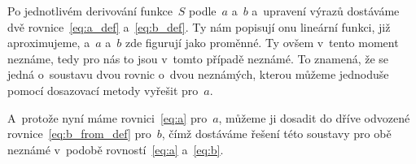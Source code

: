 Po jednotlivém derivování funkce~$S$ podle~$a$ a~$b$ a~upravení výrazů
dostáváme dvě rovnice~\eqref{eq:a_def} a~\eqref{eq:b_def}. Ty nám popisují onu
lineární funkci, již aproximujeme, a~$a$ a~$b$ zde figurují jako proměnné. Ty
ovšem v~tento moment neznáme, tedy pro nás to jsou v~tomto případě neznámé.
To znamená, že se jedná o~soustavu dvou rovnic o~dvou neznámých, kterou můžeme
jednoduše pomocí dosazovací metody vyřešit pro~$a$.

A~protože nyní máme rovnici~\eqref{eq:a}  pro~$a$, můžeme ji dosadit do dříve
odvozené rovnice~\eqref{eq:b_from_def}  pro~$b$, čímž dostáváme řešení této
soustavy pro obě neznámé v~podobě rovností~\eqref{eq:a} a~\eqref{eq:b}.

